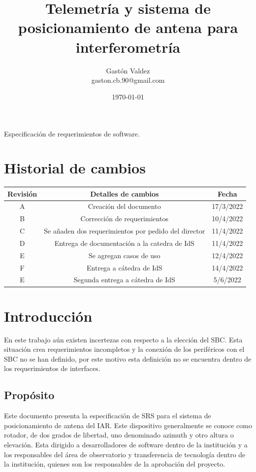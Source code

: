 \documentclass[12pt,a4paper, twosite]{article}
\date{\today}
\author{Gastón Valdez \\ gaston.cb.90@gmail.com}
\title{Telemetría y sistema de posicionamiento de antena para interferometría }
\begin{document}
\begin{titlepage}
\maketitle 
\centering \LARGE Especificación de requerimientos de software. 

\end{titlepage}

\section*{Historial de cambios  }
\begin{tabular}{|c|c|c|}
\hline 
Revisión & Detalles de cambios & Fecha  \\ \hline
A & Creación del documento & 17/3/2022 \\ \hline
B & Corrección de requerimientos &10/4/2022 \\ \hline
C & Se añaden dos requerimientos por pedido del director & 11/4/2022\\ \hline 
D & Entrega de documentación a la catedra de IdS & 11/4/2022 	\\ \hline 
E & Se agregan casos de uso & 12/4/2022 	\\ \hline 
F & Entrega a cátedra de IdS  & 14/4/2022 	\\ \hline 
E & Segunda entrega a cátedra de IdS  & 5/6/2022 	\\ \hline 

\end{tabular}



\newpage
	\tableofcontents	
\newpage
	\section{Introducción}
	\label{sec:org60390fa}
	En este trabajo aún existen incertezas con respecto a la elección del SBC. Esta situación crea requerimientos incompletos y la conexión de los periféricos con el SBC no se han definido, por este motivo esta definición no se encuentra dentro de los requerimientos de interfaces. 
	\subsection{Propósito}
	\label{sec:org434c3ef}
	Este documento presenta la especificación de SRS para el sistema de  posicionamiento de antena del IAR. Este dispositivo generalmente se conoce como rotador, de dos grados de libertad, uno denominado azimuth y otro altura o elevación.  
	Esta dirigido a desarrolladores de software dentro de la institución y a los responsables del área de observatorio y transferencia de tecnología dentro de la institución, quienes son los responsables de la aprobación del proyecto. 
	
\end{document}
